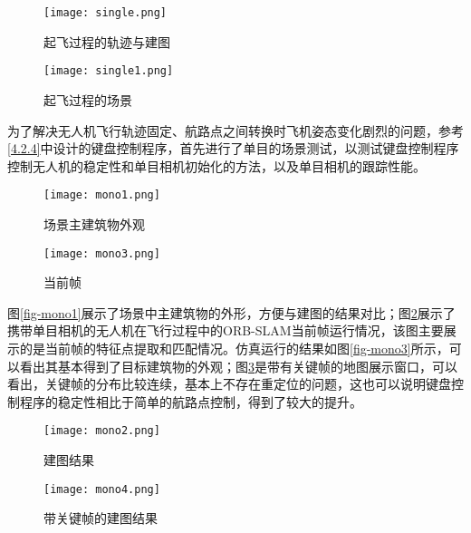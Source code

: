 \begin{figure}[htbp]
	\centering
	\begin{minipage}[t]{0.45\columnwidth} %
		\centering
		\texttt{[image: single.png]}
		\caption{起飞过程的轨迹与建图}
		\label{fig4-6}
	\end{minipage}
	\begin{minipage}[t]{0.45\columnwidth}
		\centering
		\texttt{[image: single1.png]}
		\caption{起飞过程的场景}
		\label{fig4-6-1}
	\end{minipage}
\end{figure}

为了解决无人机飞行轨迹固定、航路点之间转换时飞机姿态变化剧烈的问题，参考\ref{4.2.4}中设计的键盘控制程序，首先进行了单目的场景测试，以测试键盘控制程序控制无人机的稳定性和单目相机初始化的方法，以及单目相机的跟踪性能。

\begin{figure}[htbp]
	\centering
	\begin{minipage}[t]{0.45\columnwidth} %
		\centering
		\texttt{[image: mono1.png]}
		\caption{场景主建筑物外观}
		\label{fig-mono1}
	\end{minipage}
	\begin{minipage}[t]{0.45\columnwidth}
		\centering
		\texttt{[image: mono3.png]}
		\caption{当前帧}
		\label{fig-mono2}
	\end{minipage}
\end{figure}

图\ref{fig-mono1}展示了场景中主建筑物的外形，方便与建图的结果对比；图\ref{fig-mono2}展示了携带单目相机的无人机在飞行过程中的ORB-SLAM当前帧运行情况，该图主要展示的是当前帧的特征点提取和匹配情况。仿真运行的结果如图\ref{fig-mono3}所示，可以看出其基本得到了目标建筑物的外观；图\ref{fig-mono4}是带有关键帧的地图展示窗口，可以看出，关键帧的分布比较连续，基本上不存在重定位的问题，这也可以说明键盘控制程序的稳定性相比于简单的航路点控制，得到了较大的提升。

\begin{figure}[htbp]
	\centering
	\begin{minipage}[t]{0.45\columnwidth} %
		\centering
		\texttt{[image: mono2.png]}
		\caption{建图结果}
		\label{fig-mono3}
	\end{minipage}
	\begin{minipage}[t]{0.45\columnwidth}
		\centering
		\texttt{[image: mono4.png]}
		\caption{带关键帧的建图结果}
		\label{fig-mono4}
	\end{minipage}
\end{figure}

